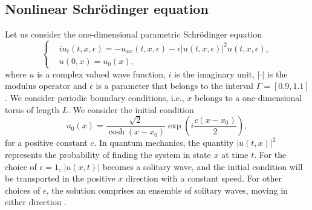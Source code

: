 \documentclass[final]{siamart}
\begin{document}
\subsection{Nonlinear Schr\"odinger equation} \label{chap:NuRe:1.2} Let us consider the one-dimensional parametric Schr\"odinger equation
\begin{equation} \label{eq:NuRe:10}
\left\{
\begin{aligned}
	& i u_t(t,x,\epsilon) = - u_{xx}(t,x,\epsilon) - \epsilon |u(t,x,\epsilon)|^2 u(t,x,\epsilon),\\
	& u(0,x) = u_0(x),
\end{aligned}
\right.
\end{equation}
where $u$ is a complex valued wave function, $i$ is the imaginary unit, $|\cdot|$ is the modulus operator and $\epsilon$ is a parameter that belongs to the interval $\Gamma = [0.9,1.1]$. We consider periodic boundary conditions, i.e., $x$ belongs to a one-dimensional torus of length $L$. We consider the initial condition
\begin{equation} \label{eq:NuRe:11}
	u_0(x) = \frac{\sqrt 2}{\cosh(x - x_0)} \exp(i\frac{c(x-x_0)}{2}),
\end{equation}
for a positive constant $c$. In quantum mechanics, the quantity $|u(t,x)|^2$ represents the probability of finding the system in state $x$ at time $t$. For the choice of $\epsilon = 1$, $|u(x,t)|$ becomes a solitary wave, and the initial condition will be transported in the positive $x$ direction with a constant speed. For other choices of $\epsilon$, the solution comprises an ensemble of solitary waves, moving in either direction \cite{Faou:2012vh}. 
\end{document}
